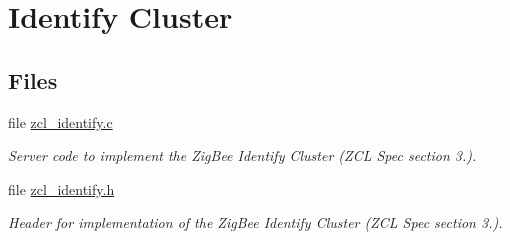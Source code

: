 \hypertarget{group__zcl__identify}{\section{Identify Cluster}
\label{group__zcl__identify}
}
\subsection*{Files}
\begin{DoxyCompactItemize}
\item 
file \hyperlink{zcl__identify_8c}{zcl\-\_\-identify.\-c}
\begin{DoxyCompactList}\small\item\em Server code to implement the Zig\-Bee Identify Cluster (Z\-C\-L Spec section 3.). \end{DoxyCompactList}\item 
file \hyperlink{zcl__identify_8h}{zcl\-\_\-identify.\-h}
\begin{DoxyCompactList}\small\item\em Header for implementation of the Zig\-Bee Identify Cluster (Z\-C\-L Spec section 3.). \end{DoxyCompactList}\end{DoxyCompactItemize}
